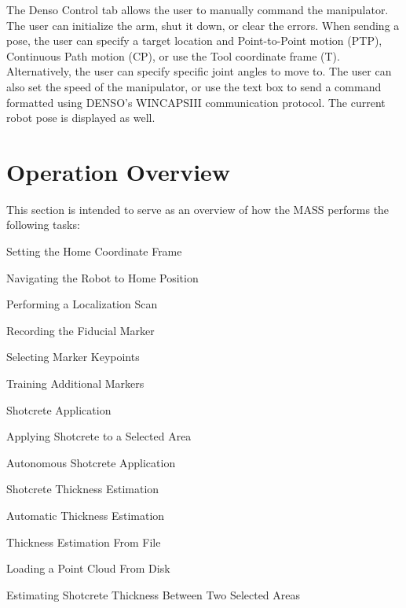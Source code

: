 The Denso Control tab allows the user to manually command the manipulator. The user can initialize the arm, shut it down, or clear the errors. When sending a pose, the user can specify a target location and Point-to-Point motion (PTP), Continuous Path motion (CP), or use the Tool coordinate frame (T). Alternatively, the user can specify specific joint angles to move to. The user can also set the speed of the manipulator, or use the text box to send a command formatted using DENSO's WINCAPSIII communication protocol. The current robot pose is displayed as well.\\
\clearpage
\section{Operation Overview}
\label{sec:manual}
This section is intended to serve as an overview of how the MASS performs the following tasks:
\begin{myitemize}
\item Setting the Home Coordinate Frame
\begin{myitemize}
\item Navigating the Robot to Home Position
\item Performing a Localization Scan
\end{myitemize}
\item Recording the Fiducial Marker
\begin{myitemize}
\item Selecting Marker Keypoints
\item Training Additional Markers
\end{myitemize}
\item Shotcrete Application
\begin{myitemize}
\item Applying Shotcrete to a Selected Area
\item Autonomous Shotcrete Application
\end{myitemize}
\item Shotcrete Thickness Estimation
\begin{myitemize}
\item Automatic Thickness Estimation
\item Thickness Estimation From File
\item Loading a Point Cloud From Disk
\item Estimating Shotcrete Thickness Between Two Selected Areas
\end{myitemize}
\end{myitemize}
